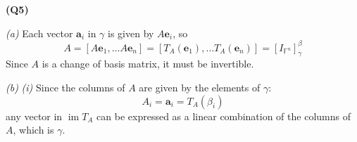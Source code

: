 \documentclass[12pt, a4paper]{article}
\newcommand{\F}{\mathbb{F}}
\newcommand{\im}{\operatorname{im}}
\begin{document}
\textbf{(Q5)}

\textit{(a)}
Each vector $\mathbf{a}_i$ in $\gamma$ is given by $A\mathbf{e}_i$, so
\[
    A = \left[A\mathbf{e}_1, \ldots A\mathbf{e}_n\right] =
    \left[T_A(\mathbf{e}_1), \ldots T_A(\mathbf{e}_n)\right] =
    \left[I_{\F^n}\right]_\gamma^\beta
\]
Since $A$ is a change of basis matrix, it must be invertible.

\textit{(b)}
\textit{(i)}
Since the columns of $A$ are given by the elements of $\gamma$:
\[
    A_i = \mathbf{a}_i = T_A(\beta_i)
\]
any vector in $\im T_A$ can be expressed as a linear combination
of the columns of $A$, which is $\gamma$.
\end{document}
